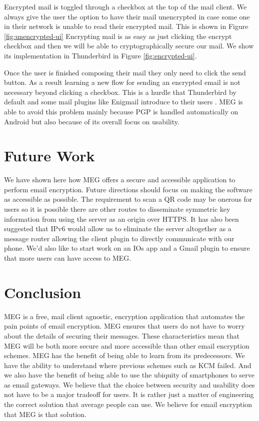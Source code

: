 \documentclass[10pt]{article}
\begin{document}
\begin{multicols}{2}
\par Encrypted mail is toggled through a checkbox at the top of the mail client. We always give the user the option to have their mail unencrypted in case some one in their network is unable to read their encrypted mail. This is shown in Figure \ref{fig:unencrypted-ui} Encrypting mail is as easy as just clicking the encrypt checkbox and then we will be able to cryptographically secure our mail. We show its implementation in Thunderbird in Figure \ref{fig:encrypted-ui}.
\par Once the user is finished composing their mail they only need to click the send button. As a result learning a new flow for sending an encrypted email is not necessary beyond clicking a checkbox. This is a hurdle that Thunderbird by default and some mail plugins like Enigmail introduce to their users \cite{enigmail-handbook}. MEG is able to avoid this problem mainly because PGP is handled automatically on Android but also because of its overall focus on usability.
\section{Future Work}
We have shown here how MEG offers a secure and accessible application to perform email encryption. Future directions should focus on making the software as accessible as possible. The requirement to scan a QR code may be onerous for users so it is possible there are other routes to disseminate symmetric key information from using the server as an origin over HTTPS. It has also been suggested that IPv6 would allow us to eliminate the server altogether as a message router allowing the client plugin to directly communicate with our phone. We'd also like to start work on an IOs app and a Gmail plugin to ensure that more users can have access to MEG.

\section{Conclusion}
\par MEG is a free, mail client agnostic, encryption application that automates the pain points of email encryption. MEG ensures that users do not have to worry about the details of securing their messages. These characteristics mean that MEG will be both more secure and more accessible than other email encryption schemes. MEG has the benefit of being able to learn from its predecessors. We have the ability to understand where previous schemes such as KCM failed. And we also have the benefit of being able to use the ubiquity of smartphones to serve as email gateways. We believe that the choice between security and usability does not have to be a major tradeoff for users. It is rather just a matter of engineering the correct solution that average people can use. We believe for email encryption that MEG is that solution.



\end{multicols}
\end{document}
